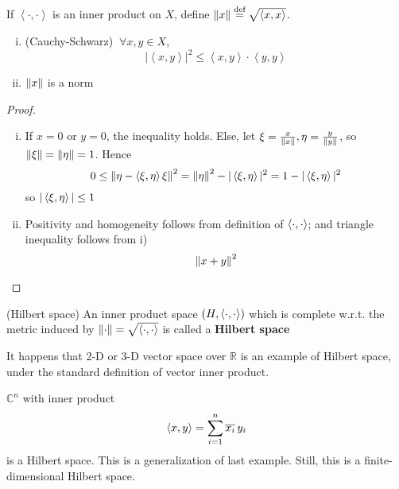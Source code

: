 \documentclass{article}
\begin{document}
\begin{theorem}
	If $\left<\cdot,\cdot\right>$ is an inner product on $X$, define $\left\|{x}\right\|\overset{\textrm{def}}{=}\sqrt{\left<{x},{x}\right>}$.  
	\begin{enumerate}[i)]
	    \item (Cauchy-Schwarz) $\ \forall x,y\in X$,
	$$|\left<x,y\right>|^2\leq\left<x,y\right>\cdot\left<y,y\right>$$
	\item $\left\|{x}\right\|$ is a norm
\end{enumerate}  
\end{theorem}

\begin{proof}
\begin{enumerate}[i)]
    \item If $x=0$ or $y=0$, the inequality holds. Else, let $\xi = \frac{x}{\left\|{x}\right\|}, \eta = \frac{y}{\left\|{y}\right\|}$, so $\left\|{\xi}\right\|=\left\|{\eta}\right\|=1$. Hence 
    $$0 \leq \left\|{\eta-\left<{\xi},{\eta}\right>\xi}\right\|^2=\left\|{\eta}\right\|^2 - |\left<{\xi},{\eta}\right>|^2=1-|\left<{\xi},{\eta}\right>|^2$$  
    so $|\left<{\xi},{\eta}\right>| \leq 1$
    \item Positivity and homogeneity follows from definition of $\left<{\cdot},{\cdot}\right>$; and triangle inequality follows from i)  
    $$\left\|{x+y}\right\|^2$$
\end{enumerate}
\end{proof}

\begin{definition}
(Hilbert space)
    An inner product space $(H, \left<{\cdot},{\cdot}\right>)$ which is complete w.r.t. the metric induced by $\left\|{\cdot}\right\|=\sqrt{\left<{\cdot},{\cdot}\right>}$ is called a \textbf{Hilbert space}
\end{definition}


\begin{unexaminable}
\begin{example}\rm\nextline
	It happens that 2-D or 3-D vector space over $\mathbb R$ is an example of Hilbert space, under the standard definition of vector inner product.
\end{example}

\begin{example}\rm\nextline
	${\mathbb C}^n$ with inner product
	$$
		\left<{x},{y}\right>=\sum_{i=1}^n {\overline{x_i}}\,y_i
	$$
	is a Hilbert space. This is a generalization of last example. Still, this is a finite-dimensional Hilbert space.
\end{example}
\end{unexaminable}
\end{document}
